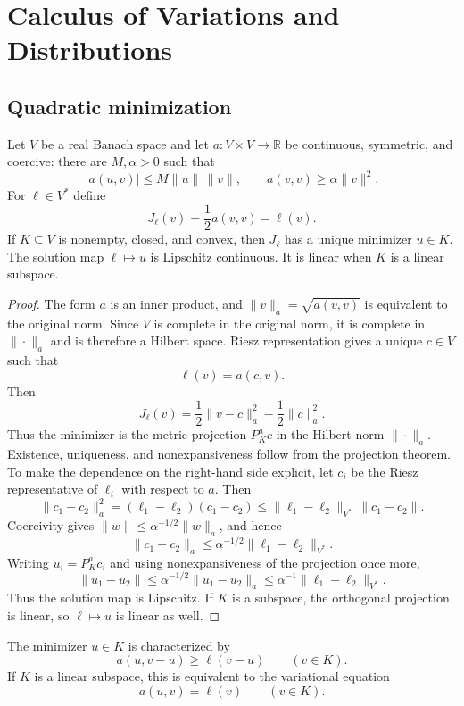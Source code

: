 \chapter{Calculus of Variations and Distributions}

\section{Quadratic minimization}

\begin{notetheorem}
Let $V$ be a real Banach space and let
$a\colon V\times V\to\mathbb R$ be continuous, symmetric, and coercive:
there are $M,\alpha>0$ such that
\[
  |a(u,v)|\le M\|u\|\,\|v\|,
  \qquad
  a(v,v)\ge\alpha\|v\|^2.
\]
For $\ell\in V^*$ define
\[
  J_\ell(v)=\frac12a(v,v)-\ell(v).
\]
If $K\subseteq V$ is nonempty, closed, and convex, then $J_\ell$ has a unique
minimizer $u\in K$.  The solution map $\ell\mapsto u$ is Lipschitz continuous.
It is linear when $K$ is a linear subspace.
\end{notetheorem}

\begin{proof}
The form $a$ is an inner product, and
$\|v\|_a=\sqrt{a(v,v)}$ is equivalent to the original norm.  Since $V$ is
complete in the original norm, it is complete in $\|\cdot\|_a$ and is
therefore a Hilbert space.  Riesz representation gives a unique $c\in V$ such
that
\[
  \ell(v)=a(c,v).
\]
Then
\[
  J_\ell(v)
  =\frac12\|v-c\|_a^2-\frac12\|c\|_a^2.
\]
Thus the minimizer is the metric projection $P_K^ac$ in the Hilbert norm
$\|\cdot\|_a$.  Existence, uniqueness, and nonexpansiveness follow from the
projection theorem.  To make the dependence on the right-hand side explicit,
let $c_i$ be the Riesz representative of $\ell_i$ with respect to $a$.  Then
\[
  \|c_1-c_2\|_a^2
  =(\ell_1-\ell_2)(c_1-c_2)
  \le \|\ell_1-\ell_2\|_{V^*}\,\|c_1-c_2\|.
\]
Coercivity gives $\|w\|\le\alpha^{-1/2}\|w\|_a$, and hence
\[
  \|c_1-c_2\|_a
  \le \alpha^{-1/2}\|\ell_1-\ell_2\|_{V^*}.
\]
Writing $u_i=P_K^ac_i$ and using nonexpansiveness of the projection once more,
\[
  \|u_1-u_2\|
  \le \alpha^{-1/2}\|u_1-u_2\|_a
  \le \alpha^{-1}\|\ell_1-\ell_2\|_{V^*}.
\]
Thus the solution map is Lipschitz.  If $K$ is a subspace, the orthogonal
projection is linear, so $\ell\mapsto u$ is linear as well.
\end{proof}

\begin{notecorollary}
The minimizer $u\in K$ is characterized by
\[
  a(u,v-u)\ge\ell(v-u)
  \qquad(v\in K).
\]
If $K$ is a linear subspace, this is equivalent to the variational equation
\[
  a(u,v)=\ell(v)
  \qquad(v\in K).
\]
\end{notecorollary}

